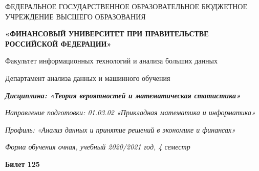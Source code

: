 \documentclass[a4paper,14pt]{article}
\begin{document}
\begin{center}
ФЕДЕРАЛЬНОЕ ГОСУДАРСТВЕННОЕ ОБРАЗОВАТЕЛЬНОЕ БЮДЖЕТНОЕ УЧРЕЖДЕНИЕ ВЫСШЕГО ОБРАЗОВАНИЯ

    \textbf{«ФИНАНСОВЫЙ УНИВЕРСИТЕТ ПРИ ПРАВИТЕЛЬСТВЕ РОССИЙСКОЙ ФЕДЕРАЦИИ»}

Факультет информационных технологий и анализа больших данных

Департамент анализа данных и машинного обучения

\textit{
	\textbf{Дисциплина: «Теория вероятностей и математическая статистика»}}

\textit{Направление подготовки: 01.03.02 «Прикладная математика и информатика»}

\textit{Профиль: «Анализ данных и принятие решений в экономике и финансах»}

\textit{Форма обучения очная, учебный 2020/2021 год, 4 семестр}

\textbf{Билет 125}

\end{center}
\end{document}
